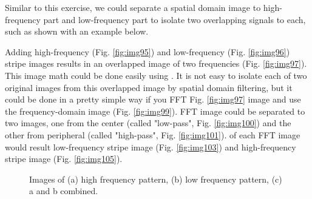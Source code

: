 Similar to this exercise, we could separate a spatial domain image to high-frequency part
and low-frequency part to isolate two overlapping signals to each, such as shown
with an example below.
 
Adding high-frequency (Fig. \ref{fig:img95}) and low-frequency (Fig. \ref{fig:img96}) stripe images 
results in an overlapped image of two frequencies (Fig. \ref{fig:img97}). This image math could be done
easily using  . It is not easy
to isolate each of two original images from this overlapped image by spatial domain filtering, but
it could be done in a pretty simple way if you FFT Fig. \ref{fig:img97} image and use the frequency-domain image (Fig. \ref{fig:img99}). 
FFT image could be separated to two images, one from the center (called "low-pass", Fig. \ref{fig:img100}) 
and the other from peripheral (called "high-pass",  Fig. \ref{fig:img101}). 
 of each FFT image would result low-frequency stripe image  (Fig. \ref{fig:img103}) and
high-frequency stripe image (Fig. \ref{fig:img105}).

\begin{figure}[htbp]
 \centering
 \caption{ Images of (a) high frequency pattern, (b) low frequency pattern, (c) a and b combined.}
 \label{fig:patternCombining}
\end{figure} 


